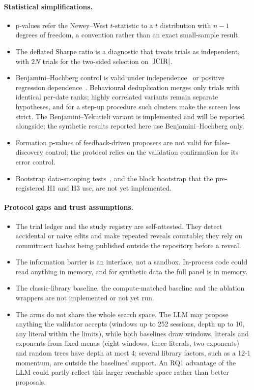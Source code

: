 \paragraph{Statistical simplifications.}
\begin{itemize}
  \item p-values refer the Newey--West $t$-statistic to a $t$ distribution
    with $n-1$ degrees of freedom, a convention rather than an exact
    small-sample result.
  \item The deflated Sharpe ratio is a diagnostic that treats trials as
    independent, with $2N$ trials for the two-sided selection on $|\mathrm{ICIR}|$.
  \item Benjamini--Hochberg control is valid under
    independence~\citep{benjamini1995fdr} or positive regression
    dependence~\citep{benjamini2001fdr}. Behavioural deduplication merges
    only trials with identical per-date ranks; highly correlated variants
    remain separate hypotheses, and for a step-up procedure such clusters
    make the screen less strict. The Benjamini--Yekutieli variant is
    implemented and will be reported alongside; the synthetic results
    reported here use Benjamini--Hochberg only.
  \item Formation p-values of feedback-driven proposers are not valid for
    false-discovery control; the protocol relies on the validation
    confirmation for its error control.
  \item Bootstrap data-snooping tests~\citep{white2000reality,hansen2005spa,romano2005stepwise},
    and the block bootstrap that the pre-registered H1 and H3 use, are not
    yet implemented.
\end{itemize}

\paragraph{Protocol gaps and trust assumptions.}
\begin{itemize}
  \item The trial ledger and the study registry are self-attested. They
    detect accidental or naive edits and make repeated reveals countable;
    they rely on commitment hashes being published outside the repository
    before a reveal.
  \item The information barrier is an interface, not a sandbox. In-process
    code could read anything in memory, and for synthetic data the full
    panel is in memory.
  \item The classic-library baseline, the compute-matched baseline and the
    ablation wrappers are not implemented or not yet run.
  \item The arms do not share the whole search space. The LLM may propose
    anything the validator accepts (windows up to 252 sessions, depth up to
    10, any literal within the limits), while both baselines draw windows,
    literals and exponents from fixed menus (eight windows, three literals,
    two exponents) and random trees have depth at most 4; several library
    factors, such as a 12-1 momentum, are outside the baselines' support. An RQ1 advantage of the LLM could partly reflect
    this larger reachable space rather than better proposals.
\end{itemize}

